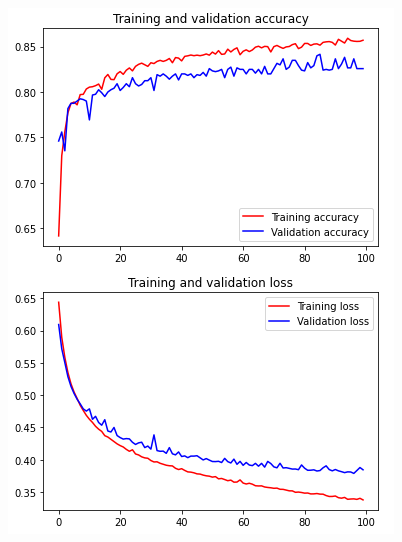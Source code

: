 \documentclass[11pt,a4paper,oneside]{article}
\begin{document}
\begin{figure}[h]
\begin{minipage}[c]{.4\textwidth}
		\includegraphics[width=.9\textwidth]{images/Task 3/VGG19 3.1/FE/Accuracy}
	\end{minipage}
	

\end{figure}
\end{document}
